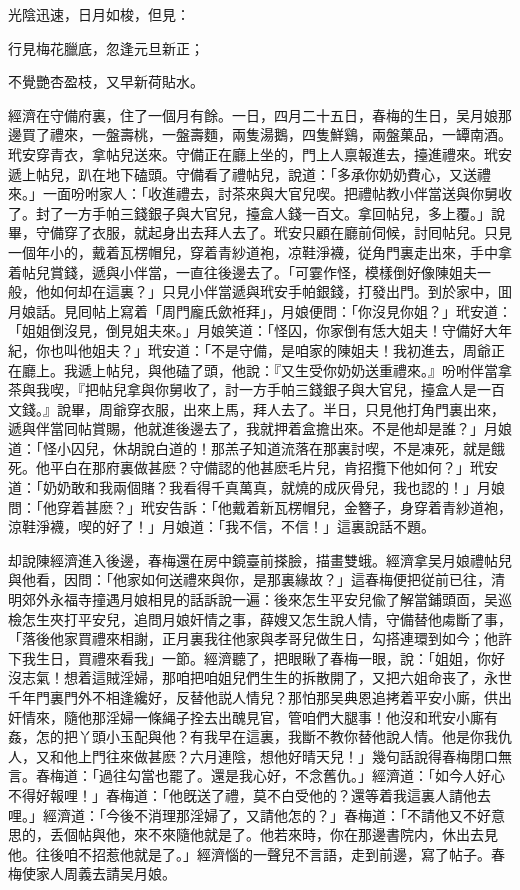 光陰迅速，日月如梭，但見：

\begin{myquote}
行見梅花臘底，忽逢元旦新正；

不覺艷杏盈枝，又早新荷貼水。
\end{myquote}

經濟在守備府裏，住了一個月有餘。一日，四月二十五日，春梅的生日，吴月娘那邊買了禮來，一盤壽桃，一盤壽麵，兩隻湯鵝，四隻鮮鷄，兩盤菓品，一罈南酒。玳安穿青衣，拿帖兒送來。守備正在廳上坐的，門上人禀報進去，擡進禮來。玳安遞上帖兒，趴在地下磕頭。守備看了禮帖兒，說道：「多承你奶奶費心，又送禮來。」一面吩咐家人：「收進禮去，討茶來與大官兒喫。把禮帖教小伴當送與你舅收了。封了一方手帕三錢銀子與大官兒，擡盒人錢一百文。拿回帖兒，多上覆。」說畢，守備穿了衣服，就起身出去拜人去了。玳安只顧在廳前伺候，討囘帖兒。只見一個年小的，戴着瓦楞帽兒，穿着青紗道袍，凉鞋淨襪，従角門裏走出來，手中拿着帖兒賞錢，遞與小伴當，一直往後邊去了。「可霎作怪，模樣倒好像陳姐夫一般，他如何却在這裏？」只見小伴當遞與玳安手帕銀錢，打發出門。到於家中，囬月娘話。見囘帖上寫着「周門龐氏歛袵拜」，月娘便問：「你沒見你姐？」玳安道：「姐姐倒沒見，倒見姐夫來。」月娘笑道：「怪囚，你家倒有恁大姐夫！守備好大年紀，你也叫他姐夫？」玳安道：「不是守備，是咱家的陳姐夫！我初進去，周爺正在廳上。我遞上帖兒，與他磕了頭，他說：『又生受你奶奶送重禮來。』吩咐伴當拿茶與我喫，『把帖兒拿與你舅收了，討一方手帕三錢銀子與大官兒，擡盒人是一百文錢。』說畢，周爺穿衣服，出來上馬，拜人去了。半日，只見他打角門裏出來，遞與伴當囘帖賞賜，他就進後邊去了，我就押着盒擔出來。不是他却是誰？」月娘道：「怪小囚兒，休胡說白道的！那羔子知道流落在那裏討喫，不是凍死，就是餓死。他平白在那府裏做甚麽？守備認的他甚麽毛片兒，肯招攬下他如何？」玳安道：「奶奶敢和我兩個賭？我看得千真萬真，就燒的成灰骨兒，我也認的！」月娘問：「他穿着甚麽？」玳安告訴：「他戴着新瓦楞帽兒，金簪子，身穿着青紗道袍，涼鞋淨襪，喫的好了！」月娘道：「我不信，不信！」這裏說話不題。

却說陳經濟進入後邊，春梅還在房中鏡臺前搽臉，描畫雙蛾。經濟拿吴月娘禮帖兒與他看，因問：「他家如何送禮來與你，是那裏緣故？」這春梅便把従前已往，清明郊外永福寺撞遇月娘相見的話訴說一遍：後來怎生平安兒偸了解當鋪頭靣，吴巡檢怎生夾打平安兒，追問月娘奸情之事，薛嫂又怎生說人情，守備替他䖏斷了事，「落後他家買禮來相謝，正月裏我往他家與孝哥兒做生日，勾搭連環到如今；他許下我生日，買禮來看我」一節。經濟聽了，把眼瞅了春梅一眼，說：「姐姐，你好沒志氣！想着這賊淫婦，那咱把咱姐兒們生生的拆散開了，又把六姐命丧了，永世千年門裏門外不相逢纔好，反替他説人情兒？那怕那吴典恩追拷着平安小廝，供出奸情來，隨他那淫婦一條䋲子拴去出醜見官，管咱們大腿事！他沒和玳安小廝有姦，怎的把丫頭小玉配與他？有我早在這裏，我斷不教你替他說人情。他是你我仇人，又和他上門往來做甚麽？六月連陰，想他好晴天兒！」幾句話說得春梅閉口無言。春梅道：「過往勾當也罷了。還是我心好，不念舊仇。」經濟道：「如今人好心不得好報哩！」春梅道：「他旣送了禮，莫不白受他的？還等着我這裏人請他去哩。」經濟道：「今後不消理那淫婦了，又請他怎的？」春梅道：「不請他又不好意思的，丢個帖與他，來不來隨他就是了。他若來時，你在那邊書院内，休出去見他。往後咱不招惹他就是了。」經濟惱的一聲兒不言語，走到前邊，寫了帖子。春梅使家人周義去請吴月娘。

